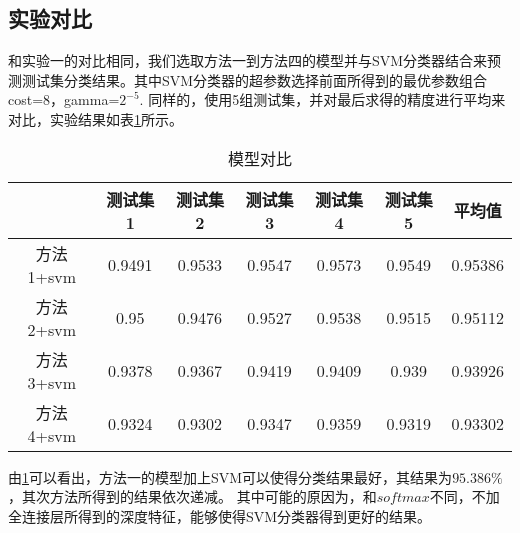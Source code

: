 \documentclass[lang=cn,11pt,a4paper,cite=authoryear]{elegantpaper}
\begin{document}
\subsection{实验对比}
和实验一的对比相同，我们选取方法一到方法四的模型并与SVM分类器结合来预测测试集分类结果。其中SVM分类器的超参数选择前面所得到的最优参数组合cost=8，gamma=$2^{-5}$.
同样的，使用5组测试集，并对最后求得的精度进行平均来对比，实验结果如表\ref{tab:table7}所示。


\begin{table}[htbp]
  \centering
  \caption{模型对比}
    \begin{tabular}{|c|c|c|c|c|c|c|}
    \toprule
          & 测试集1  & 测试集2  & 测试集3  & 测试集4  & 测试集5  & 平均值 \\
    \midrule
    方法1+svm & 0.9491 & 0.9533 & 0.9547 & 0.9573 & 0.9549 & \cellcolor[rgb]{ .753,  0,  0}0.95386 \\
    \midrule
    方法2+svm & 0.95  & 0.9476 & 0.9527 & 0.9538 & 0.9515 & \cellcolor[rgb]{ 1,  0,  0}0.95112 \\
    \midrule
    方法3+svm & 0.9378 & 0.9367 & 0.9419 & 0.9409 & 0.939 & \cellcolor[rgb]{ 1,  .486,  .502}0.93926 \\
    \midrule
    方法4+svm & 0.9324 & 0.9302 & 0.9347 & 0.9359 & 0.9319 & \cellcolor[rgb]{ 1,  .8,  .8}0.93302 \\
    \bottomrule
    \end{tabular}%
  \label{tab:table7}%
\end{table}%

由\ref{tab:table7}可以看出，方法一的模型加上SVM可以使得分类结果最好，其结果为$95.386\%$，其次方法所得到的结果依次递减。
其中可能的原因为，和$softmax$不同，不加全连接层所得到的深度特征，能够使得SVM分类器得到更好的结果。
\end{document}
